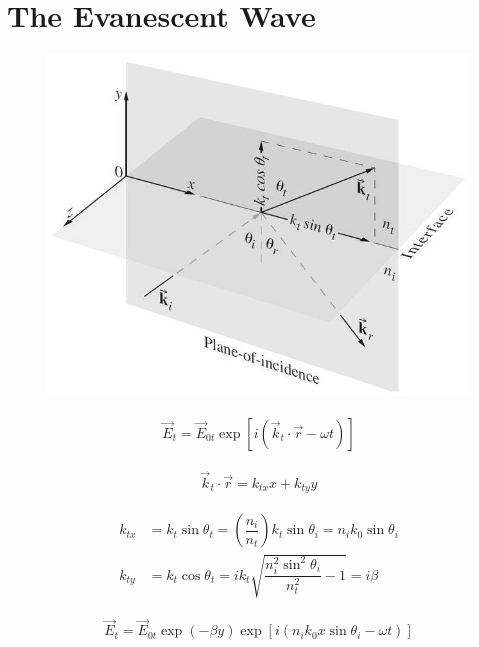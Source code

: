 \section{The Evanescent Wave}

\begin{figure}[H]
  \centering
  \includegraphics[width=0.5\linewidth]{figures/Evanescent-wave}
  \label{fig:}
\end{figure}

\begin{equation*}
  \begin{aligned}
    \vec{E}_t = \vec{E}_{0t} \exp \left[ i \left( \vec{k}_t  \cdot \vec{r} - \omega t \right) \right]
  \end{aligned}
\end{equation*}

\begin{equation*}
  \begin{aligned}
    \vec{k}_t \cdot \vec{r} = k_{tx} x + k_{ty} y
  \end{aligned}
\end{equation*}

\begin{equation*}
  \begin{aligned}
    k_{tx} &= k_t \sin \theta_t = \left( \dfrac{n_i}{n_t}  \right) k_t \sin \theta_i = n_i k_0 \sin \theta_i \\
    k_{ty} &= k_t \cos \theta_t = i k_t \sqrt{\dfrac{n_i^2 \sin^2 \theta_i}{n_t^2} - 1} = i \beta
  \end{aligned}
\end{equation*}

\begin{equation*}
  \begin{aligned}
    \vec{E}_t = \vec{E}_{0t} \exp \left( - \beta y \right) \exp \left[ i \left( n_i k_0 x \sin \theta_i - \omega t \right) \right]
  \end{aligned}
\end{equation*}

